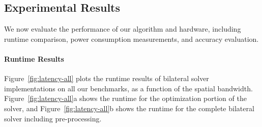\subsection{Experimental Results}

We now evaluate the performance of our algorithm and hardware, including runtime comparison, power consumption measurements, and accuracy evaluation.

\paragraph{Runtime Results}

Figure~\ref{fig:latency-all} plots the runtime results of bilateral solver implementations on all our benchmarks, as a function of the spatial bandwidth.
Figure~\ref{fig:latency-all}a shows the runtime for the optimization portion of the solver, and Figure~\ref{fig:latency-all}b shows the runtime for the complete bilateral solver including pre-processing.


